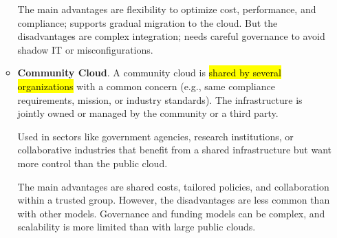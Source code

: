\begin{enumerate}
\begin{itemize}
        \highspace
        The main advantages are flexibility to optimize cost, performance, and compliance; supports gradual migration to the cloud. But the disadvantages are complex integration; needs careful governance to avoid shadow IT or misconfigurations.
        
        
        \item \textbf{Community Cloud}. A community cloud is \hl{shared by several organizations} with a common concern (e.g., same compliance requirements, mission, or industry standards). The infrastructure is jointly owned or managed by the community or a third party.
        
        \highspace
        Used in sectors like government agencies, research institutions, or collaborative industries that benefit from a shared infrastructure but want more control than the public cloud.

        \highspace
        The main advantages are shared costs, tailored policies, and collaboration within a trusted group. However, the disadvantages are less common than with other models. Governance and funding models can be complex, and scalability is more limited than with large public clouds.
    \end{itemize}
\end{enumerate}